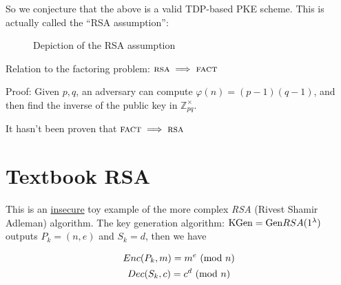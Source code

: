 So we conjecture that the above is a valid TDP-based PKE scheme. This is actually called the ``RSA assumption'':

\begin{figure}[h!]
    \centering
    \sdinit{}
    \caption{Depiction of the RSA assumption}
    \label{fig:game_pke-rsa}
\end{figure}

Relation to the factoring problem: $\textsc{rsa} \implies \textsc{fact}$

Proof: Given $p, q$, an adversary can compute $\varphi(n) = (p-1)(q-1)$, and then find the inverse of the public key in $\mathbb{Z}_{pq}^\times$.

It hasn't been proven that $\textsc{fact} \implies \textsc{rsa}$









\section{Textbook RSA}
This is an \underline{insecure} toy example of the more complex \textit{RSA} (Rivest Shamir Adleman) algorithm.
The key generation algorithm: $\mathrm{KGen}=\mathrm{Gen} RSA(1^{\lambda})$ outputs $P_k=(n,e)$ and $S_k=d$, then we have

\begin{gather*}
    Enc(P_k,m)=m^e\ (\mathrm{mod}\ n)\\
    Dec(S_k,c)=c^d\ (\mathrm{mod}\ n)
\end{gather*}

